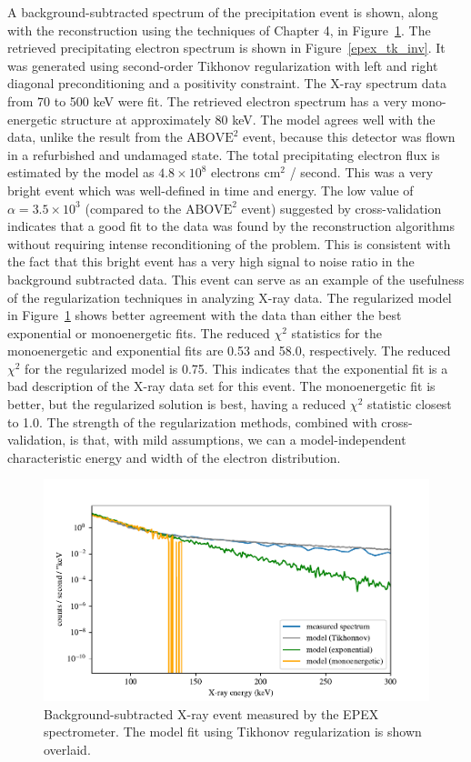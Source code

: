A background-subtracted spectrum of the precipitation event is shown, along with the reconstruction using the techniques of Chapter 4, in Figure~\ref{epex_fit_comparison}. The retrieved precipitating electron spectrum is shown in Figure~\ref{epex_tk_inv}. It was generated using second-order Tikhonov regularization with left and right diagonal preconditioning and a positivity constraint. The X-ray spectrum data from 70 to 500 keV were fit. The retrieved electron spectrum has a very mono-energetic structure at approximately 80 keV. The model agrees well with the data, unlike the result from the $\text{ABOVE}^2$ event, because this detector was flown in a refurbished and undamaged state. The total precipitating electron flux is estimated by the model as $4.8\times 10^8$ electrons $\text{cm}^2$ / second. This was a very bright event which was well-defined in time and energy. The low value of $\alpha = 3.5\times10^3$ (compared to the $\text{ABOVE}^2$ event) suggested by cross-validation indicates that a good fit to the data was found by the reconstruction algorithms without requiring intense reconditioning of the problem. This is consistent with the fact that this bright event has a very high signal to noise ratio in the background subtracted data. This event can serve as an example of the usefulness of the regularization techniques in analyzing X-ray data. The regularized model in Figure~\ref{epex_fit_comparison} shows better agreement with the data than either the best exponential or monoenergetic fits. The reduced $\chi ^2$ statistics for the monoenergetic and exponential fits are 0.53 and 58.0, respectively. The reduced $\chi ^2$ for the regularized model is 0.75. This indicates that the exponential fit is a bad description of the X-ray data set for this event. The monoenergetic fit is better, but the regularized solution is best, having a reduced $\chi ^2$ statistic closest to 1.0. The strength of the regularization methods, combined with cross-validation, is that, with mild assumptions, we can a model-independent characteristic energy and width of the electron distribution. 

\begin{figure}[p]
    \centering
    \includegraphics[width=1.0\textwidth]{figures/chapter_5/epex_fit_comparison/epex_fit_comparison2.pdf}
    \caption{Background-subtracted X-ray event measured by the EPEX spectrometer. The model fit using Tikhonov regularization is shown overlaid.}
    \label{epex_fit_comparison}
\end{figure}

